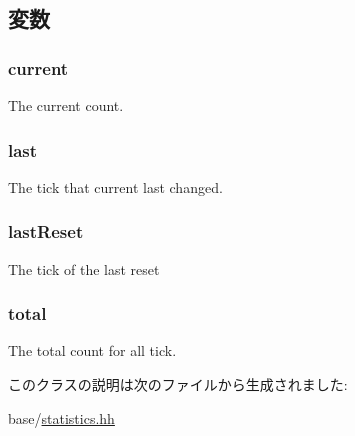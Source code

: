 \subsection{変数}
\hypertarget{classStats_1_1AvgStor_a8ffc13ee1adbc256e2b14f5ffd475e46}{
\subsubsection[{current}]{ {\bf current}}}
\label{classStats_1_1AvgStor_a8ffc13ee1adbc256e2b14f5ffd475e46}
The current count. \hypertarget{classStats_1_1AvgStor_ab8f820db3f03367136bd4f90c3e777ae}{
\subsubsection[{last}]{ {\bf last}}}
\label{classStats_1_1AvgStor_ab8f820db3f03367136bd4f90c3e777ae}
The tick that current last changed. \hypertarget{classStats_1_1AvgStor_a996b16fe37ded6fe6672ce165837dcda}{
\subsubsection[{lastReset}]{ {\bf lastReset}}}
\label{classStats_1_1AvgStor_a996b16fe37ded6fe6672ce165837dcda}
The tick of the last reset \hypertarget{classStats_1_1AvgStor_a7e957a9c5865c112db82214b368136e6}{
\subsubsection[{total}]{ {\bf total}}}
\label{classStats_1_1AvgStor_a7e957a9c5865c112db82214b368136e6}
The total count for all tick. 

このクラスの説明は次のファイルから生成されました:\begin{DoxyCompactItemize}
\item 
base/\hyperlink{statistics_8hh}{statistics.hh}\end{DoxyCompactItemize}
